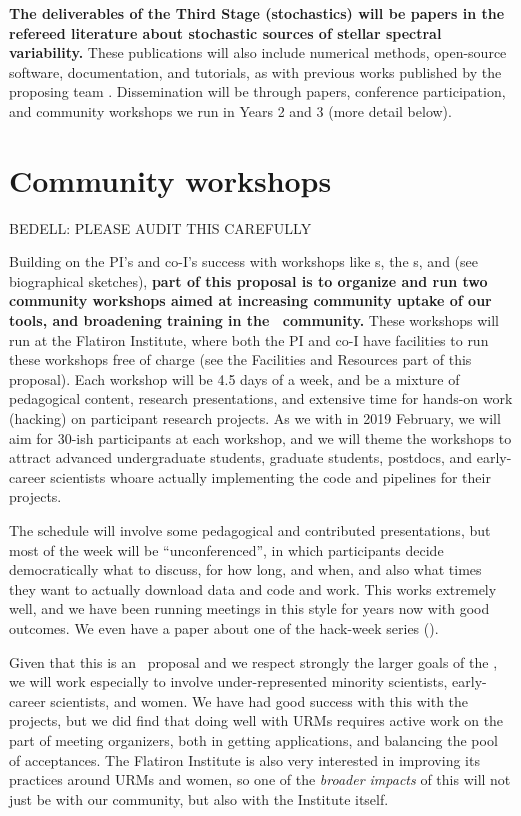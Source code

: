 \documentclass[12pt, letterpaper]{article}
\begin{document}
\textbf{The deliverables of the Third Stage (stochastics) will be papers in the
refereed literature about stochastic sources of stellar spectral
variability.}
These publications will also include numerical methods, open-source software, 
documentation, and tutorials, as with previous works published by the 
proposing team \citep[e.g.][]{Bedell2019}.
Dissemination will be through papers, conference participation, and
community workshops we run in Years 2 and 3 (more detail below).

\section{Community workshops}

BEDELL: PLEASE AUDIT THIS CAREFULLY

Building on the PI's and co-I's success with workshops like
s, the s,
 and 
(see biographical sketches), \textbf{part of this proposal is to organize and
run two community workshops aimed at increasing community uptake of our
tools, and broadening training in the \EPRV\ community.}
These workshops will run at the Flatiron Institute, where both the
PI and co-I have facilities to run these workshops free of charge
(see the Facilities and Resources part of this proposal).
Each workshop will be 4.5 days of a week, and be a mixture of
pedagogical content, research presentations, and extensive time for
hands-on work (hacking) on participant research projects.
As we with  in 2019 February, we
will aim for 30-ish participants at each workshop, and we will theme
the workshops to attract advanced undergraduate students, graduate
students, postdocs, and early-career scientists whoare actually
implementing the code and pipelines for their projects.

The schedule will involve some pedagogical and contributed presentations,
but most of the week will be ``unconferenced'', in which participants
decide democratically what to discuss, for how long, and when, and also
what times they want to actually download data and code and work.
This works extremely well, and we have been running meetings in this 
style for years now with good outcomes.
We even have a paper about one of the hack-week series (\citealt{AHW}).

Given that this is an \NSF\ proposal and we respect strongly the larger
goals of the \NSF, we will work especially to involve
under-represented minority scientists, early-career scientists, and women.
We have had good success with this with the  projects,
but we did find that doing well with URMs requires active work on the part
of meeting organizers, both in getting applications, and balancing the pool
of acceptances.
The Flatiron Institute is also very interested in improving its practices
around URMs and women, so one of the \emph{broader impacts} of this will
not just be with our community, but also with the Institute itself.
\end{document}
